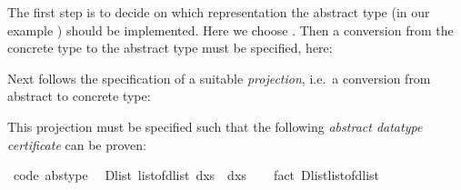 \begin{isabellebody}
\begin{isamarkuptext}
  The first step is to decide on which representation the abstract
  type (in our example ) should be implemented.
  Here we choose .  Then a conversion from the concrete
  type to the abstract type must be specified, here:%
\end{isamarkuptext}%
\isamarkuptrue%
%
\isadelimquote
%
\endisadelimquote
%
\isatagquote
%
\begin{isamarkuptext}%
%
\end{isamarkuptext}%
\isamarkuptrue%
%
\endisatagquote
{\isafoldquote}%
%
\isadelimquote
%
\endisadelimquote
%
\begin{isamarkuptext}%
\noindent Next follows the specification of a suitable \emph{projection},
  i.e.~a conversion from abstract to concrete type:%
\end{isamarkuptext}%
\isamarkuptrue%
%
\isadelimquote
%
\endisadelimquote
%
\isatagquote
%
\begin{isamarkuptext}%
%
\end{isamarkuptext}%
\isamarkuptrue%
%
\endisatagquote
{\isafoldquote}%
%
\isadelimquote
%
\endisadelimquote
%
\begin{isamarkuptext}%
\noindent This projection must be specified such that the following
  \emph{abstract datatype certificate} can be proven:%
\end{isamarkuptext}%
\isamarkuptrue%
%
\isadelimquote
%
\endisadelimquote
%
\isatagquote
{}\isamarkupfalse%
\ {}code\ abstype{}{}\isanewline
\ \ {}Dlist\ {}list{}of{}dlist\ dxs{}\ {}\ dxs{}\isanewline
\ \ \isamarkupfalse%
\ {}fact\ Dlist{}list{}of{}dlist{}%

\end{isabellebody}
